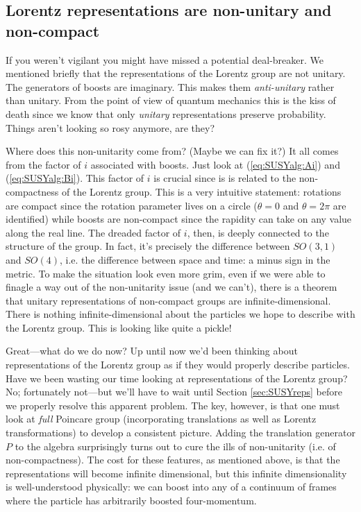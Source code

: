 \documentclass[12pt]{article}
\numberwithin{equation}{section}    %
\begin{document}
\subsection{Lorentz representations are non-unitary and non-compact}\label{sec:SUSYalg:nonunitary}
If you weren't vigilant you might have missed a potential deal-breaker. We mentioned briefly that the representations of the Lorentz group are not unitary. The generators of boosts are imaginary. This makes them \textit{anti-unitary} rather than unitary. From the point of view of quantum mechanics this is the kiss of death since we know that only \textit{unitary} representations preserve probability. Things aren't looking so rosy anymore, are they? 

Where does this non-unitarity come from? (Maybe we can fix it?) It all comes from the factor of $i$ associated with boosts. Just look at (\ref{eq:SUSYalg:Ai}) and (\ref{eq:SUSYalg:Bi}). This factor of $i$ is crucial since is is related to the non-compactness of the Lorentz group. This is a very intuitive statement: rotations are compact since the rotation parameter lives on a circle ($\theta=0$ and $\theta=2\pi$ are identified) while boosts are non-compact since the rapidity can take on any value along the real line. The dreaded factor of $i$, then, is deeply connected to the structure of the group. In fact, it's precisely the difference between $SO(3,1)$ and $SO(4)$, i.e. the difference between space and time: a minus sign in the metric. To make the situation look even more grim, even if we were able to finagle a way out of the non-unitarity issue (and we can't), there is a theorem that unitary representations of non-compact groups are infinite-dimensional. There is nothing infinite-dimensional about the particles we hope to describe with the Lorentz group. This is looking like quite a pickle!

Great---what do we do now? Up until now we'd been thinking about representations of the Lorentz group as if they would properly describe particles. Have we been wasting our time looking at representations of the Lorentz group? No; fortunately not---but we'll have to wait until Section \ref{sec:SUSYreps} before we properly resolve this apparent problem. The key, however, is that one must look at \textit{full} Poincare group (incorporating translations as well as Lorentz transformations) to develop a consistent picture. Adding the translation generator $P$ to the algebra surprisingly turns out to cure the ills of non-unitarity (i.e. of non-compactness). The cost for these features, as mentioned above, is that the representations will become infinite dimensional, but this infinite dimensionality is well-understood physically: we can boost into any of a continuum of frames where the particle has arbitrarily boosted four-momentum. %
\end{document}
